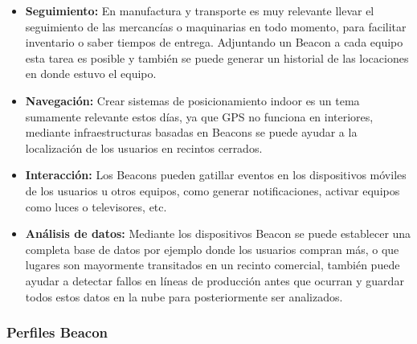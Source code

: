 \begin{itemize}
\item \textbf{Seguimiento: } En manufactura y transporte es muy relevante llevar el seguimiento de las mercancías o maquinarias en todo momento, para facilitar inventario o saber tiempos de entrega. Adjuntando un Beacon a cada equipo esta tarea es posible y también se puede generar un historial de las locaciones en donde estuvo el equipo.

\item \textbf{Navegación: } Crear sistemas de posicionamiento indoor es un tema sumamente relevante estos días, ya que GPS no funciona en interiores, mediante infraestructuras basadas en Beacons se puede ayudar a la localización de los usuarios en recintos cerrados.

\item \textbf{Interacción: } Los Beacons pueden gatillar eventos en los dispositivos móviles de los usuarios u otros equipos, como generar notificaciones, activar equipos como luces o televisores, etc.

\item \textbf{Análisis de datos: } Mediante los dispositivos Beacon se puede establecer una completa base de datos por ejemplo donde los usuarios compran más, o que lugares son mayormente transitados en un recinto comercial, también puede ayudar a detectar fallos en líneas de producción antes que ocurran y guardar todos estos datos en la nube para posteriormente ser analizados.


\end{itemize}

\subsubsection{Perfiles Beacon}

